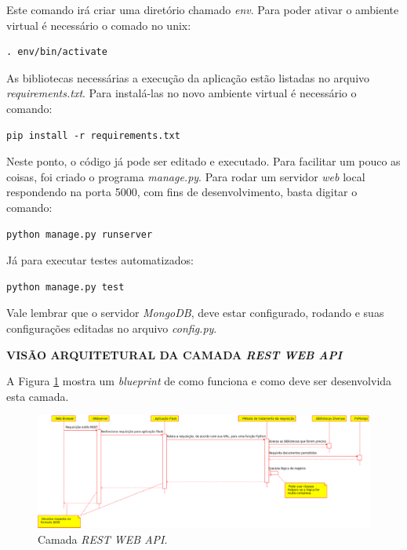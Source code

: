 Este comando irá criar uma diretório chamado \emph{env}. Para poder ativar o ambiente virtual é necessário o comado no unix:
\lstset{language=bash}
\begin{lstlisting}[frame=single]
. env/bin/activate
\end{lstlisting}

As bibliotecas necessárias a execução da aplicação estão listadas no arquivo \emph{requirements.txt}. Para instalá-las no novo ambiente virtual é necessário o comando:
\lstset{language=bash}
\begin{lstlisting}[frame=single]
pip install -r requirements.txt
\end{lstlisting}

Neste ponto, o código já pode ser editado e executado. Para facilitar um pouco as coisas, foi criado o programa \emph{manage.py}. Para rodar um servidor \emph{web} local respondendo na porta 5000, com fins de desenvolvimento, basta digitar o comando:
\lstset{language=bash}
\begin{lstlisting}[frame=single]
python manage.py runserver
\end{lstlisting}

Já para executar testes automatizados:
\lstset{language=bash}
\begin{lstlisting}[frame=single]
python manage.py test
\end{lstlisting}

Vale lembrar que o servidor \emph{MongoDB}, deve estar configurado, rodando e suas configurações editadas no arquivo \emph{config.py}.


\textbf{VISÃO ARQUITETURAL DA CAMADA \emph{REST WEB API}} 

\noindent
A Figura \ref{camada_api} mostra um \emph{blueprint} de como funciona e como deve ser desenvolvida esta camada.
\begin{figure}[ht]
	\centering
	\includegraphics[width=15cm]{figuras/camada_api.eps}
	\caption{Camada \emph{REST WEB API}.}
	\label{camada_api}
\end{figure}

